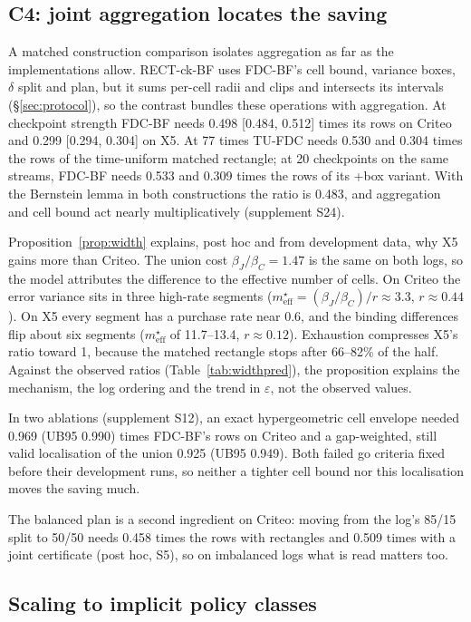 \documentclass[sigconf,anonymous,review]{acmart}
\newcommand{\eps}{\varepsilon}
\newcommand{\meff}{m_{\text{eff}}}
\begin{document}
\subsection{C4: joint aggregation locates the saving}\label{sec:c4}

A matched construction comparison isolates aggregation as far as the implementations allow. RECT-ck-BF uses FDC-BF's cell bound, variance boxes, $\delta$ split and plan, but it sums per-cell radii and clips and intersects its intervals (\S\ref{sec:protocol}), so the contrast bundles these operations with aggregation. At checkpoint strength FDC-BF needs 0.498 [0.484, 0.512] times its rows on Criteo and 0.299 [0.294, 0.304] on X5. At 77 times TU-FDC needs 0.530 and 0.304 times the rows of the time-uniform matched rectangle; at 20 checkpoints on the same streams, FDC-BF needs 0.533 and 0.309 times the rows of its +box variant. With the Bernstein lemma in both constructions the ratio is 0.483, and aggregation and cell bound act nearly multiplicatively (supplement S24).

Proposition~\ref{prop:width} explains, post hoc and from development data, why X5 gains more than Criteo. The union cost $\beta_J/\beta_C = 1.47$ is the same on both logs, so the model attributes the difference to the effective number of cells. On Criteo the error variance sits in three high-rate segments ($\meff^\star = (\beta_J/\beta_C)/r \approx 3.3$, $r \approx 0.44$). On X5 every segment has a purchase rate near 0.6, and the binding differences flip about six segments ($\meff^\star$ of 11.7--13.4, $r \approx 0.12$). Exhaustion compresses X5's ratio toward 1, because the matched rectangle stops after 66--82\% of the half. Against the observed ratios (Table~\ref{tab:widthpred}), the proposition explains the mechanism, the log ordering and the trend in $\eps$, not the observed values.

In two ablations (supplement S12), an exact hypergeometric cell envelope needed 0.969 (UB95 0.990) times FDC-BF's rows on Criteo and a gap-weighted, still valid localisation of the union 0.925 (UB95 0.949). Both failed go criteria fixed before their development runs, so neither a tighter cell bound nor this localisation moves the saving much.

The balanced plan is a second ingredient on Criteo: moving from the log's 85/15 split to 50/50 needs 0.458 times the rows with rectangles and 0.509 times with a joint certificate (post hoc, S5), so on imbalanced logs what is read matters too.

\subsection{Scaling to implicit policy classes}\label{sec:scale}
\end{document}
